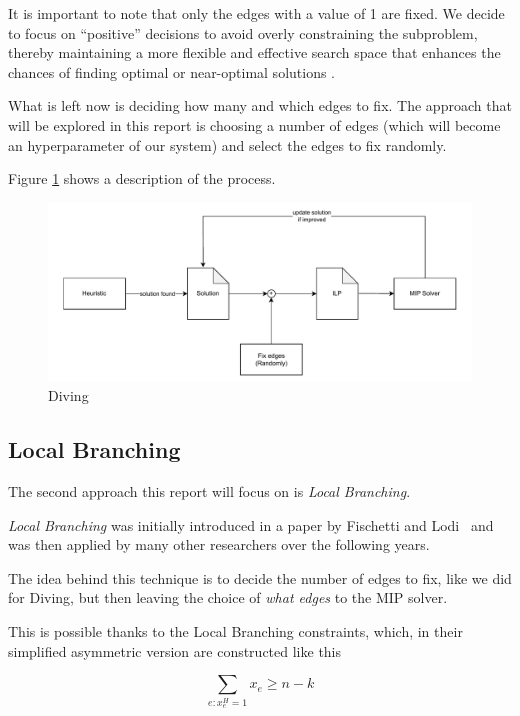 \documentclass{article}
\begin{document}
It is important to note that only the edges with a value of 1 are fixed. We
decide to focus on ``positive'' decisions to avoid overly constraining the
subproblem, thereby maintaining a more flexible and effective search space that
enhances the chances of finding optimal or near-optimal solutions \cite{maniezzo2021diving}.

What is left now is deciding how many and which edges to fix. The approach that will be explored
in this report is choosing a number of edges (which will become an hyperparameter of our system)
and select the edges to fix randomly.

Figure \ref{fig:diving} shows a description of the process.

\begin{figure}[H]
        \caption{Diving}
        \label{fig:diving}
        \centering
        \includegraphics[width=340pt]{assets/diving.drawio.pdf}
\end{figure}

\subsection{Local Branching}
The second approach this report will focus on is \textit{Local Branching}.

\textit{Local Branching} was initially introduced in a paper by Fischetti and Lodi~\cite{fischetti2003local} and was then applied by many other researchers over the following
years.

The idea behind this technique is to decide the number of edges to fix, like we did for Diving,
but then leaving the choice of \textit{what edges} to the MIP solver.

This is possible thanks to the Local Branching constraints, which, in their simplified
asymmetric version are constructed like this

\begin{equation*}
        \sum_{e : x_{e}^{H}=1} x_{e} \geq n - k
\end{equation*}
\end{document}
